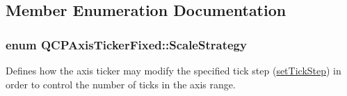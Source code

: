 \subsection{Member Enumeration Documentation}
\subsubsection[{\texorpdfstring{Scale\+Strategy}{ScaleStrategy}}]{\setlength{\rightskip}{0pt plus 5cm}enum {\bf Q\+C\+P\+Axis\+Ticker\+Fixed\+::\+Scale\+Strategy}}\hypertarget{classQCPAxisTickerFixed_a15b3d38b935d404b1311eb85cfb6a439}{}\label{classQCPAxisTickerFixed_a15b3d38b935d404b1311eb85cfb6a439}
Defines how the axis ticker may modify the specified tick step (\hyperlink{classQCPAxisTickerFixed_a4bc83d85a4f81d4abdd3fa5042d7b833}{set\+Tick\+Step}) in order to control the number of ticks in the axis range.

